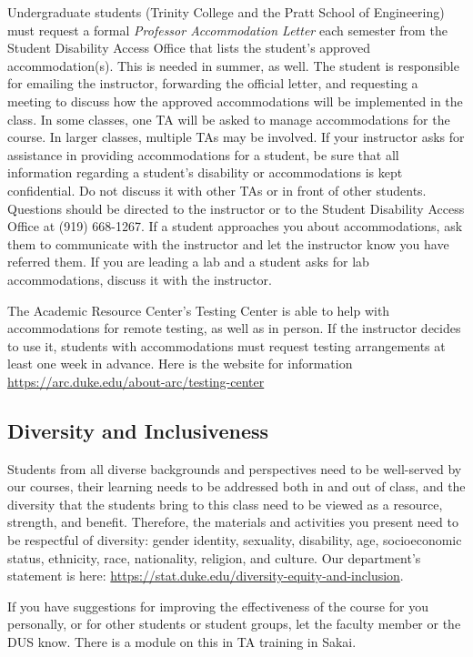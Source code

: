 \documentclass[
]{article}
\begin{document}
Undergraduate students (Trinity College and the Pratt School of Engineering) must request a formal \emph{Professor Accommodation Letter} each semester from the Student Disability Access Office that lists the student's approved accommodation(s). This is needed in summer, as well. The student is responsible for emailing the instructor, forwarding the official letter, and requesting a meeting to discuss how the approved accommodations will be implemented in the class. In some classes, one TA will be asked to manage accommodations for the course. In larger classes, multiple TAs may be involved. If your instructor asks for assistance in providing accommodations for a student, be sure that all information regarding a student's disability or accommodations is kept confidential. Do not discuss it with other TAs or in front of other students. Questions should be directed to the instructor or to the Student Disability Access Office at (919) 668-1267. If a student approaches you about accommodations, ask them to communicate with the instructor and let the instructor know you have referred them. If you are leading a lab and a student asks for lab accommodations, discuss it with the instructor.

The Academic Resource Center's Testing Center is able to help with accommodations for remote testing, as well as in person. If the instructor decides to use it, students with accommodations must request testing arrangements at least one week in advance. Here is the website for information \url{https://arc.duke.edu/about-arc/testing-center}

\hypertarget{diversity-and-inclusiveness}{%
\subsection{Diversity and Inclusiveness}\label{diversity-and-inclusiveness}}

Students from all diverse backgrounds and perspectives need to be well-served by our courses, their learning needs to be addressed both in and out of class, and the diversity that the students bring to this class need to be viewed as a resource, strength, and benefit. Therefore, the materials and activities you present need to be respectful of diversity: gender identity, sexuality, disability, age, socioeconomic status, ethnicity, race, nationality, religion, and culture. Our department's statement is here: \url{https://stat.duke.edu/diversity-equity-and-inclusion}.

If you have suggestions for improving the effectiveness of the course for you personally, or for other students or student groups, let the faculty member or the DUS know. There is a module on this in TA training in Sakai.
\end{document}
